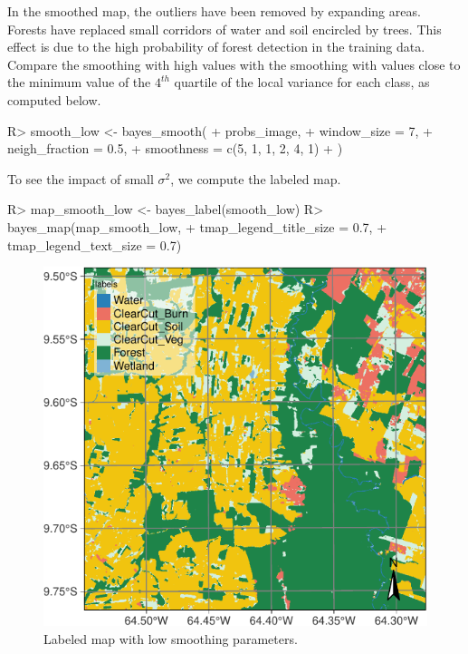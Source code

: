 \documentclass[
  shortnames]{jss}
\begin{document}
In the smoothed map, the outliers have been removed by expanding  areas. Forests have replaced small corridors of water and soil encircled by trees. This effect is due to the high probability of forest detection in the training data. Compare the smoothing with high values with the smoothing with values close to the minimum value of the \(4^{th}\) quartile of the local variance for each class, as computed below.

\begin{CodeChunk}
\begin{CodeInput}
R> smooth_low <- bayes_smooth(
+     probs_image,
+     window_size = 7,
+     neigh_fraction = 0.5,
+     smoothness = c(5, 1, 1, 2, 4, 1)
+ )
\end{CodeInput}
\end{CodeChunk}

To see the impact of small \(\sigma^2\), we compute the labeled map.

\begin{CodeChunk}
\begin{CodeInput}
R> map_smooth_low <- bayes_label(smooth_low)
R> bayes_map(map_smooth_low,           
+           tmap_legend_title_size = 0.7,
+           tmap_legend_text_size = 0.7)
\end{CodeInput}
\begin{figure}[h]

{\centering \includegraphics{Bayesian_smoothing_JSS_files/figure-latex/smth2-1} 

}

\caption[Labeled map with low smoothing parameters]{Labeled map with low smoothing parameters.}\label{fig:smth2}
\end{figure}
\end{CodeChunk}
\end{document}
